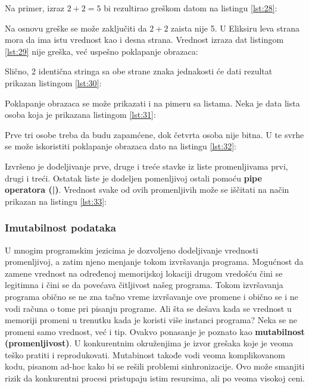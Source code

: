 \documentclass[12pt,oneside]{memoir}
\begin{document}
Na primer, izraz $2 + 2 = 5$ bi rezultirao greškom datom na listingu \ref{lst:28}:



Na osnovu greške se može zaključiti da $2 + 2$ zaista nije 5. U Eliksiru leva strana mora da ima istu vrednost kao i desna strana. Vrednost izraza dat listingom \ref{lst:29} nije greška, već uspešno poklapanje obrazaca:



Slično, 2 identična stringa sa obe strane znaka jednakosti će dati rezultat prikazan listingom \ref{lst:30}:



Poklapanje obrazaca se može prikazati i na pimeru sa listama. Neka je data lista osoba koja je prikazana listingom \ref{lst:31}:



Prve tri osobe treba da budu zapamćene, dok četvrta osoba nije bitna. U te svrhe se može iskoristiti poklapanje obrazaca dato na listingu \ref{lst:32}:



Izvršeno je dodeljivanje prve, druge i treće stavke iz liste promenljivama prvi, drugi i treći. Ostatak liste je dodeljen pomenljivoj ostali pomoću \textbf{pipe operatora (|)}. Vrednost svake od ovih promenljivih može se iščitati na način prikazan na listingu \ref{lst:33}:

\newpage



\subsubsection{Imutabilnost podataka}

U mnogim programskim jezicima je dozvoljeno dodeljivanje vrednosti promenljivoj, a zatim njeno menjanje tokom izvršavanja programa. Mogućnost da zamene vrednost na određenoj memorijskoj lokaciji drugom vredošću čini se legitimna i čini se da povećava čitljivost našeg programa. Tokom izvršavanja programa obično se ne zna tačno vreme izvršavanje ove promene i obično se i ne vodi računa o tome pri pisanju programe. Ali šta se dešava kada se vrednost u memoriji promeni u trenutku kada je koristi više instanci programa? Neka se ne promeni samo vrednost, već i tip. Ovakvo ponasanje je poznato kao \textbf{mutabilnost (promenljivost)}. U konkurentnim okruženjima je izvor grešaka koje je veoma teško pratiti i reprodukovati. Mutabinost takođe vodi veoma komplikovanom kodu, pisanom ad-hoc kako bi se rešili problemi sinhronizacije. Ovo može smanjiti rizik da konkurentni procesi  pristupaju istim resursima, ali po veoma visokoj ceni.
\end{document}

